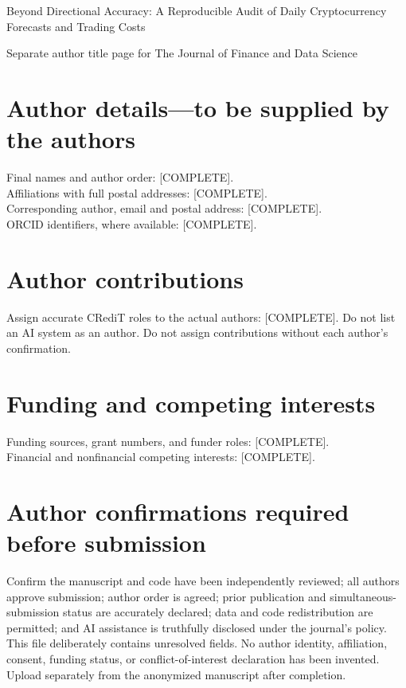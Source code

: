 \documentclass[12pt]{article}
\begin{document}
\begin{center}
{\Large Beyond Directional Accuracy: A Reproducible Audit of Daily Cryptocurrency Forecasts and Trading Costs\par}
\vspace{1cm}
Separate author title page for The Journal of Finance and Data Science
\end{center}
\section*{Author details---to be supplied by the authors}
Final names and author order: [COMPLETE].\\
Affiliations with full postal addresses: [COMPLETE].\\
Corresponding author, email and postal address: [COMPLETE].\\
ORCID identifiers, where available: [COMPLETE].
\section*{Author contributions}
Assign accurate CRediT roles to the actual authors: [COMPLETE]. Do not list an AI system as an author. Do not assign contributions without each author's confirmation.
\section*{Funding and competing interests}
Funding sources, grant numbers, and funder roles: [COMPLETE].\\
Financial and nonfinancial competing interests: [COMPLETE].
\section*{Author confirmations required before submission}
Confirm the manuscript and code have been independently reviewed; all authors approve submission; author order is agreed; prior publication and simultaneous-submission status are accurately declared; data and code redistribution are permitted; and AI assistance is truthfully disclosed under the journal's policy.
\vspace{1em}
This file deliberately contains unresolved fields. No author identity, affiliation, consent, funding status, or conflict-of-interest declaration has been invented. Upload separately from the anonymized manuscript after completion.
\end{document}
